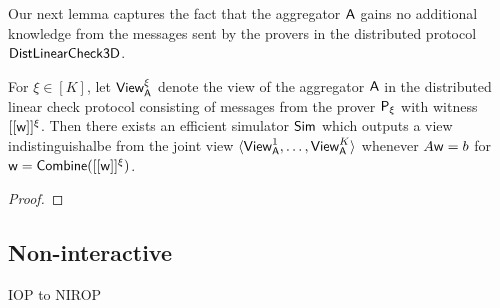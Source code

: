 Our next lemma captures the fact that the aggregator $\mathsf{A}$ gains no additional
knowledge from the messages sent by the provers in the distributed protocol
$\mathsf{DistLinearCheck3D}$. 

\begin{lemma}\label{lem:distlincheckzk}
For $\xi\in [K]$, let $\mathsf{View}^\xi_{\mathsf{A}}$ denote the view of the aggregator $\mathsf{A}$ in the distributed
linear check protocol consisting of messages from the prover $\mathsf{P}_\xi$ with
witness $[[{\mathsf{w}}]]^\xi$. Then there exists an efficient simulator $\mathsf{Sim}$
which outputs a view indistinguishalbe from the joint view $\langle
\mathsf{View}^1_{\mathsf{A}},\ldots,\mathsf{View}^K_{\mathsf{A}}\rangle$ whenever $A\mathsf{w}=b$ for
$\mathsf{w}=\mathsf{Combine}([[{\mathsf{w}}]]^\xi)$.
\end{lemma}
\begin{proof}

\end{proof}



   



\subsection{Non-interactive}
IOP to NIROP
